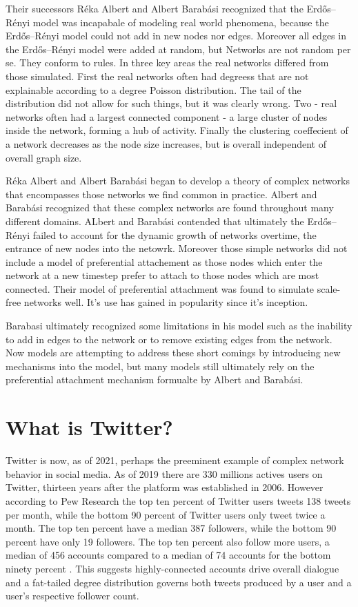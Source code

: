 Their successors Réka Albert and Albert Barabási recognized that the Erdős–Rényi model 
was incapabale of modeling real world phenomena, because the Erdős–Rényi model could not add
in new nodes nor edges. Moreover all edges in the Erdős–Rényi model were added at random, but Networks
are not random per se. They conform to rules. In three key areas the real networks differed from those
simulated. \cite{barabasi2016network} First the real networks often had degreess that are not explainable according to a degree
Poisson distribution. The tail of the distribution did not allow for such things, but it was 
clearly wrong. Two - real networks often had a largest connected component - a large cluster 
of nodes inside the network, forming a hub of activity. Finally the clustering coeffecient of a network
decreases as the node size increases, but is overall independent of overall graph size.


Réka Albert and Albert Barabási began to develop a theory of complex networks that 
encompasses those networks we find common in practice. Albert and Barabási 
recognized that these complex networks are found throughout many different domains. ALbert and Barabási contended that ultimately the 
Erdős–Rényi failed to account for the dynamic growth of networks overtime, the entrance of new nodes
into the netowrk. Moreover those simple networks did not include a model of preferential attachement
as those nodes which enter the network at a new timestep prefer to attach to those nodes which are most
connected. Their model of preferential attachment was found to simulate scale-free networks well. It's use
has gained in popularity since it's inception.

Barabasi ultimately recognized some limitations in his model such as the inability to add in edges to the network
or to remove existing edges from the network. \cite{barabasi2016network} Now models are attempting to address
these short comings by introducing new mechanisms into the model, but many models still ultimately rely on
the preferential attachment mechanism formualte by Albert and Barabási.

\section{What is Twitter?}
Twitter is now, as of 2021, perhaps the preeminent example of complex network behavior in social media.
As of 2019 there are 330 millions actives users on Twitter, thirteen years after the platform was
established in 2006. However according to Pew Research the top ten percent of Twitter users tweets 138 
tweets per month, while the bottom 90 percent of Twitter users only tweet twice a month. The top ten percent
have a median 387 followers, while the bottom 90 percent have only 19 followers. The top ten percent
also follow more users, a median of 456 accounts compared to a median of 74 accounts for the bottom ninety percent \cite{wojcik2019sizing}.
This suggests highly-connected accounts drive overall dialogue and a fat-tailed
degree distribution governs both tweets produced by a user and a user's respective follower count.


